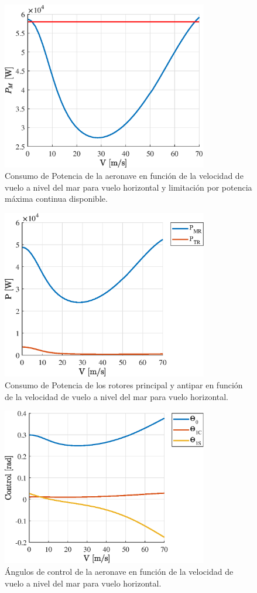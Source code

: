 \begin{figure}
	\centering
	\includegraphics[width=90mm]{graficos/PMVH}
	\caption{Consumo de Potencia de la aeronave en función de la velocidad de vuelo a nivel del mar para vuelo horizontal y limitación por potencia máxima continua disponible.}
	\label{PMVH}
\end{figure}
\begin{figure}
	\centering
	\includegraphics[width=90mm]{graficos/PVH}
	\caption{Consumo de Potencia de los rotores principal y antipar en función de la velocidad de vuelo a nivel del mar para vuelo horizontal.}
	\label{PVH}
\end{figure}
\begin{figure}
	\centering
	\includegraphics[width=90mm]{graficos/ControlVH}
	\caption{Ángulos de control de la aeronave en función de la velocidad de vuelo a nivel del mar para vuelo horizontal.}
	\label{ControlVH}
\end{figure}
